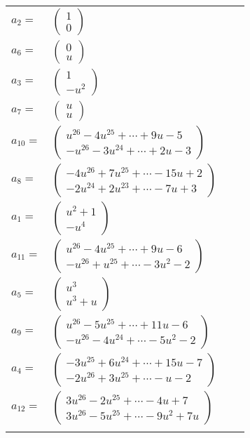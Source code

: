 \documentclass[1p]{elsarticle_modified}
\theoremstyle{definition}
\begin{document}
\begin{tabular}{m{7pt} m{180pt} m{7pt} m{180pt} }
\flushright $a_{2}=$&$\begin{pmatrix}1\\0\end{pmatrix}$ \\
\flushright $a_{6}=$&$\begin{pmatrix}0\\u\end{pmatrix}$ \\
\flushright $a_{3}=$&$\begin{pmatrix}1\\- u^2\end{pmatrix}$ \\
\flushright $a_{7}=$&$\begin{pmatrix}u\\u\end{pmatrix}$ \\
\flushright $a_{10}=$&$\begin{pmatrix}u^{26}-4 u^{25}+\cdots+9 u-5\\- u^{26}-3 u^{24}+\cdots+2 u-3\end{pmatrix}$ \\
\flushright $a_{8}=$&$\begin{pmatrix}-4 u^{26}+7 u^{25}+\cdots-15 u+2\\-2 u^{24}+2 u^{23}+\cdots-7 u+3\end{pmatrix}$ \\
\flushright $a_{1}=$&$\begin{pmatrix}u^2+1\\- u^4\end{pmatrix}$ \\
\flushright $a_{11}=$&$\begin{pmatrix}u^{26}-4 u^{25}+\cdots+9 u-6\\- u^{26}+u^{25}+\cdots-3 u^2-2\end{pmatrix}$ \\
\flushright $a_{5}=$&$\begin{pmatrix}u^3\\u^3+u\end{pmatrix}$ \\
\flushright $a_{9}=$&$\begin{pmatrix}u^{26}-5 u^{25}+\cdots+11 u-6\\- u^{26}-4 u^{24}+\cdots-5 u^2-2\end{pmatrix}$ \\
\flushright $a_{4}=$&$\begin{pmatrix}-3 u^{25}+6 u^{24}+\cdots+15 u-7\\-2 u^{26}+3 u^{25}+\cdots- u-2\end{pmatrix}$ \\
\flushright $a_{12}=$&$\begin{pmatrix}3 u^{26}-2 u^{25}+\cdots-4 u+7\\3 u^{26}-5 u^{25}+\cdots-9 u^2+7 u\end{pmatrix}$\\&\end{tabular}
\end{document}
